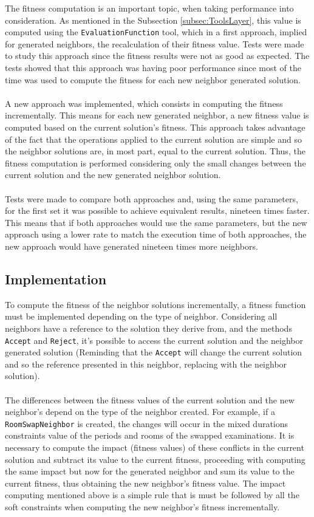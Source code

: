 The fitness computation is an important topic, when taking performance into consideration. As mentioned in the Subsection \ref{subsec:ToolsLayer}, this value is computed using the \verb+EvaluationFunction+ tool, which in a first approach, implied for generated neighbors, the recalculation of their fitness value. Tests were made to study this approach since the fitness results were not as good as expected. The tests showed that this approach was having poor performance since most of the time was used to compute the fitness for each new neighbor generated solution.\\
\\
A new approach was implemented, which consists in computing the fitness incrementally. This means for each new generated neighbor, a new fitness value is computed based on the current solution's fitness. This approach takes advantage of the fact that the operations applied to the current solution are simple and so the neighbor solutions are, in most part, equal to the current solution. Thus, the fitness computation is performed considering only the small changes between the current solution and the new generated neighbor solution.\\
\\
Tests were made to compare both approaches and, using the same parameters, for the first set it was possible to achieve equivalent results, nineteen times faster. This means that if both approaches would use the same parameters, but the new approach using a lower rate to match the execution time of both approaches, the new approach would have generated nineteen times more neighbors.

\subsection{Implementation}

To compute the fitness of the neighbor solutions incrementally, a fitness function must be implemented depending on the type of neighbor. Considering all neighbors have a reference to the solution they derive from, and the methods \verb+Accept+ and \verb+Reject+, it's possible to access the current solution and the neighbor generated solution (Reminding that the \verb+Accept+ will change the current solution and so the reference presented in this neighbor, replacing with the neighbor solution). \\
\\
The differences between the fitness values of the current solution and the new neighbor's depend on the type of the neighbor created. For example, if a \verb+RoomSwapNeighbor+ is created, the changes will occur in the mixed durations constraints value of the periods and rooms of the swapped examinations. It is necessary to compute the impact (fitness values) of these conflicts in the current solution and subtract its value to the current fitness, proceeding with computing the same impact but now for the generated neighbor and sum its value to the current fitness, thus obtaining the new neighbor's fitness value. The impact computing mentioned above is a simple rule that is must be followed by all the soft constraints when computing the new neighbor's fitness incrementally.